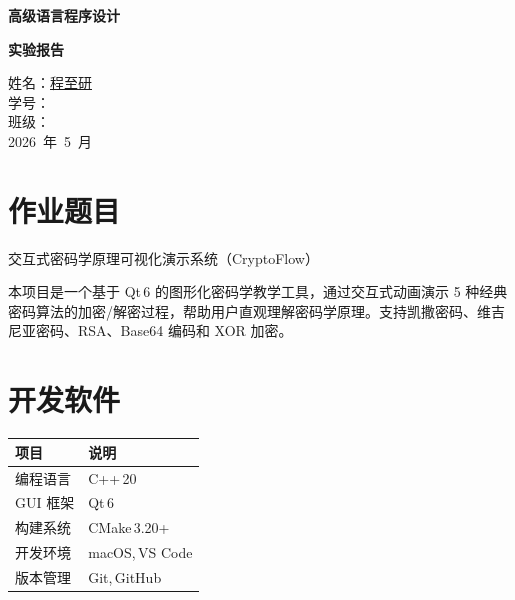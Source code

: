 \documentclass[a4paper,UTF8]{ctexart}
\begin{document}
\thispagestyle{cover}
\begin{center}
  \vspace*{3cm}

  \vspace{2cm}
  {\coverfont\LARGE\bfseries 高级语言程序设计}

  \vspace{0.8cm}
  {\coverfont\LARGE\bfseries 实验报告}

  \vspace{3cm}
  {\large
    姓名：\underline{\quad 程至研 \quad} \\[1em]
    学号：\underline{ \quad} \\[1em]
    班级：\underline{ \qquad} \\[1em]
    2026\ 年\ 5\ 月
  }
\end{center}

\newpage

\tableofcontents
\newpage


\section{作业题目}

交互式密码学原理可视化演示系统（CryptoFlow）

本项目是一个基于 Qt\,6 的图形化密码学教学工具，通过交互式动画演示 5 种经典密码算法的加密/解密过程，帮助用户直观理解密码学原理。支持凯撒密码、维吉尼亚密码、RSA、Base64 编码和 XOR 加密。

\section{开发软件}

\begin{center}
\begin{tabularx}{0.85\textwidth}{lX}
\toprule
\textbf{项目} & \textbf{说明} \\
\midrule
编程语言   & C++\,20 \\
GUI 框架   & Qt\,6 \\
构建系统   & CMake\,3.20+ \\
开发环境   & macOS\;,\;\,VS Code \\
版本管理   & Git\;,\;\,GitHub \\
\bottomrule
\end{tabularx}
\end{center}
\end{document}
